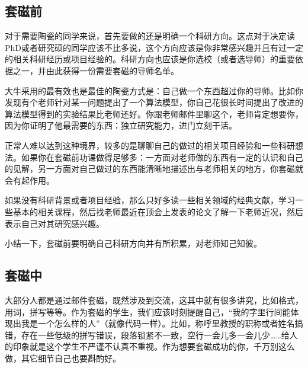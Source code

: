 \subsection{套磁前}
对于需要陶瓷的同学来说，首先要做的还是明确一个科研方向。这点对于决定读PhD或者研究硕的同学应该不比多说，这个方向应该是你非常感兴趣并且有过一定的相关科研经历或项目经验的。科研方向也应该是你选校（或者选导师）的重要依据之一，并由此获得一份需要套磁的导师名单。\par

大牛采用的最有效也是最佳的陶瓷方式是：自己做一个东西超过你的导师。比如你发现有个老师针对某一问题提出了一个算法模型，你自己花很长时间提出了改进的算法模型得到的实验结果比老师还好。你跟老师邮件里聊这个，老师肯定想要你，因为你证明了他最需要的东西：独立研究能力，进门立刻干活。\par

正常人难以达到这种境界，较多的是聊聊自己的做过的相关项目经验和一些科研想法。如果你在套磁前功课做得足够多：一方面对老师做的东西有一定的认识和自己的见解，另一方面对自己做过的东西能清晰地描述出与老师相关的地方，你套磁就会有起作用。\par

如果没有科研背景或者项目经验，那么只好多读一些相关领域的经典文献，学习一些基本的相关课程，然后找老师最近在顶会上发表的论文了解一下老师近况，然后表示自己对其研究感兴趣。\par

小结一下，套磁前要明确自己科研方向并有所积累，对老师知己知彼。
\subsection{套磁中}
大部分人都是通过邮件套磁，既然涉及到交流，这其中就有很多讲究，比如格式，用词，拼写等等。作为套磁的学生，我们应该时刻提醒自己，“我的字里行间能体现出我是一个怎么样的人”（就像代码一样）。比如，称呼里教授的职称或者姓名搞错，存在一些低级的拼写错误，段落锁紧不一致，空行一会儿多一会儿少……给人的印象就是这个学生不严谨不认真不重视。作为想要套磁成功的你，千万别这么做，其它细节自己也要斟酌好。\par

